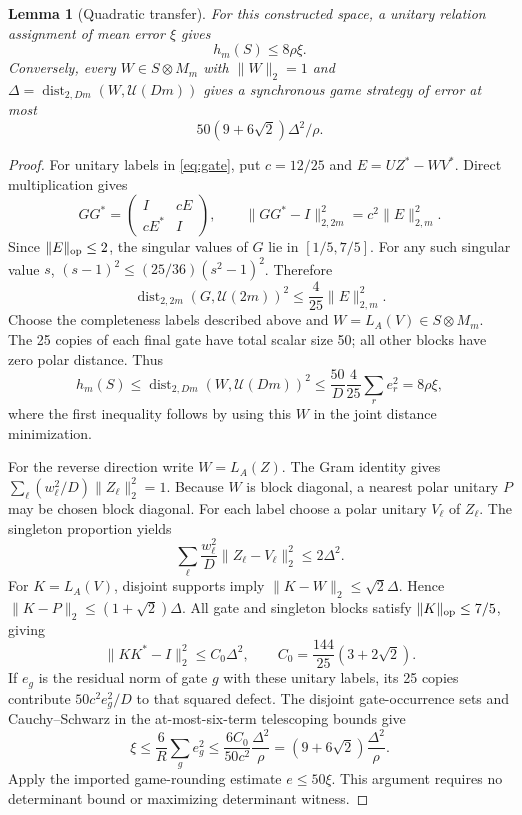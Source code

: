 \documentclass[11pt,a4paper]{article}
\newtheorem{lemma}[theorem]{Lemma}
\newcommand{\dist}{\operatorname{dist}}
\newcommand{\norm}[1]{\lVert#1\rVert}
\begin{document}
\begin{lemma}[Quadratic transfer]\label{lem:transfer}
For this constructed space, a unitary relation assignment of mean error $\xi$ gives
\begin{equation}
 h_m(S)\le8\rho\xi.                                  \label{eq:forward}
\end{equation}
Conversely, every $W\in S\otimes M_m$ with $\norm W_2=1$ and
$\Delta=\dist_{2,Dm}(W,\mathcal U(Dm))$ gives a synchronous game strategy of error at most
\begin{equation}
 50(9+6\sqrt2)\Delta^2/\rho.                          \label{eq:round}
\end{equation}
\end{lemma}
\begin{proof}
For unitary labels in \eqref{eq:gate}, put $c=12/25$ and $E=UZ^*-WV^*$. Direct multiplication gives
\[
 GG^*=\begin{pmatrix}I&cE\\cE^*&I\end{pmatrix},\qquad
 \norm{GG^*-I}_{2,2m}^2=c^2\norm E_{2,m}^2.
\]
Since $\norm E_{\rm op}\le2$, the singular values of $G$ lie in $[1/5,7/5]$. For any such singular value $s$,
$(s-1)^2\le(25/36)(s^2-1)^2$. Therefore
\[
 \dist_{2,2m}(G,\mathcal U(2m))^2\le\frac4{25}\norm E_{2,m}^2.
\]
Choose the completeness labels described above and $W=L_A(V)\in S\otimes M_m$. The 25 copies of each final gate have total scalar size 50; all other blocks have zero polar distance. Thus
\[
 h_m(S)\le\dist_{2,Dm}(W,\mathcal U(Dm))^2
 \le\frac{50}{D}\frac4{25}\sum_r e_r^2=8\rho\xi,
\]
where the first inequality follows by using this $W$ in the joint distance minimization.

For the reverse direction write $W=L_A(Z)$. The Gram identity gives
$\sum_\ell(w_\ell^2/D)\norm{Z_\ell}_2^2=1$. Because $W$ is block diagonal, a nearest polar unitary $P$ may be chosen block diagonal. For each label choose a polar unitary $V_\ell$ of $Z_\ell$. The singleton proportion yields
\[
 \sum_\ell\frac{w_\ell^2}{D}\norm{Z_\ell-V_\ell}_2^2\le2\Delta^2.
\]
For $K=L_A(V)$, disjoint supports imply $\norm{K-W}_2\le\sqrt2\Delta$.
Hence $\norm{K-P}_2\le(1+\sqrt2)\Delta$. All gate and singleton blocks satisfy
$\norm K_{\rm op}\le7/5$, giving
\[
 \norm{KK^*-I}_2^2\le C_0\Delta^2,
 \qquad C_0=\frac{144}{25}(3+2\sqrt2).
\]
If $e_g$ is the residual norm of gate $g$ with these unitary labels, its 25 copies contribute $50c^2e_g^2/D$ to that squared defect. The disjoint gate-occurrence sets and Cauchy--Schwarz in the at-most-six-term telescoping bounds give
\[
 \xi\le\frac6R\sum_g e_g^2
 \le\frac{6C_0}{50c^2}\frac{\Delta^2}{\rho}
 =(9+6\sqrt2)\frac{\Delta^2}{\rho}.
\]
Apply the imported game-rounding estimate $e\le50\xi$. This argument requires no determinant bound or maximizing determinant witness.
\end{proof}
\end{document}
